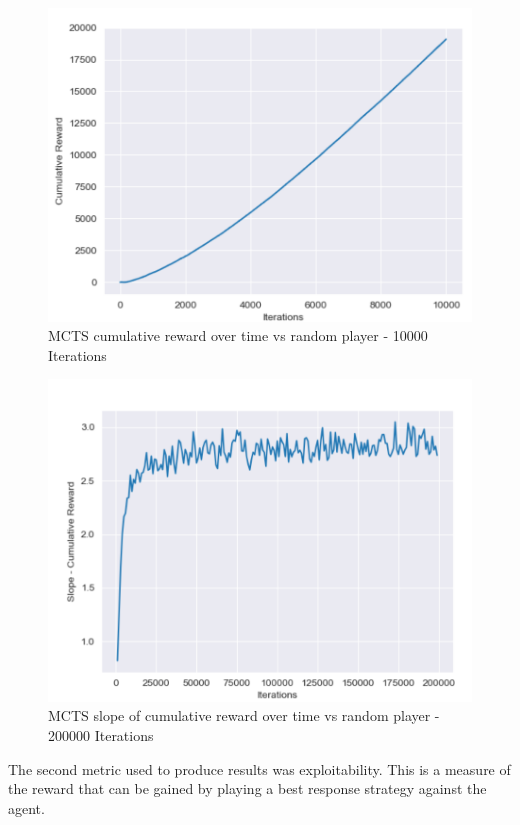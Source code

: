 \begin{figure}[ht]
    \includegraphics[scale=.8]{images/cumulative_reward_mcts_vs_random.png}
    \caption{MCTS cumulative reward over time vs random player - 10000 Iterations}
\end{figure}

\begin{figure}[ht]
    \includegraphics[scale=.8]{images/slope_cumulative_reward_vs_random_player.PNG}
    \caption{MCTS slope of cumulative reward over time vs random player - 200000 Iterations}
\end{figure}

The second metric used to produce results was exploitability.
This is a measure of the reward that can be gained by playing a best response strategy
against the agent.

